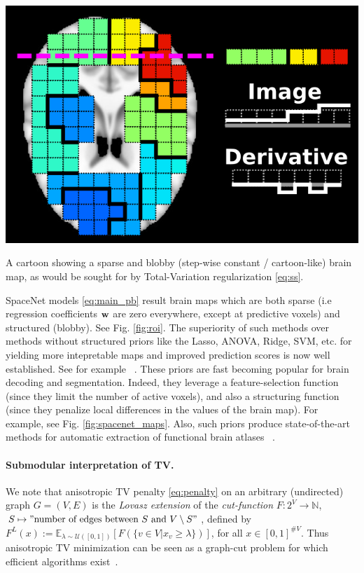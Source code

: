 \begin{marginfigure}
  \includegraphics[width=1\linewidth]{figures/tv_cartoon_horizontal.png}
  \caption{A cartoon showing a sparse and blobby (step-wise constant / cartoon-like) brain map,
  as would be sought for by Total-Variation regularization \eqref{eq:ss}.}
  \label{fig:roi}
\end{marginfigure}

SpaceNet models \eqref{eq:main_pb} result brain maps which are both
sparse (i.e regression coefficients $\mathbf{w}$ are zero everywhere, except at
predictive voxels) and structured (blobby). See Fig. \ref{fig:roi}. The superiority of such
methods over methods without structured priors like the Lasso, ANOVA,
Ridge, SVM, etc. for yielding more intepretable maps and improved
prediction scores is now well established. See for example
 ~\citep{baldassarre2012,gramfort2013}. These priors are fast becoming
popular for brain decoding and segmentation. Indeed, they leverage a
feature-selection function
(since they limit the number of active voxels),
and also a structuring function
(since they penalize local
differences in the values of the brain map). For example, see Fig.
\ref{fig:spacenet_maps}.
Also, such priors produce state-of-the-art methods for automatic
extraction of functional brain atlases  ~\citep{abraham2013}.

\begin{shaded}
  \paragraph{Submodular interpretation of TV.} We note that anisotropic TV penalty \eqref{eq:penalty} on
  an arbitrary (undirected) graph $G = (V,E)$ is the \textit{Lovasz extension} of the \textit{cut-function}
  $F : 2^V \rightarrow \mathbb N$, $S \mapsto "\text{number of edges between } S \text{ and }V\setminus S"$,
defined by $F^L(x) := \mathbb E_{\lambda \sim \mathcal U([0,1])}[F(\{v \in V|x_v \ge \lambda\})]$, for all $x \in [0,1]^{\#V}$. Thus anisotropic TV minimization can be seen as a graph-cut problem for which efficient algorithms exist~\citep{bach13sub,landrieu16}.
\end{shaded}

